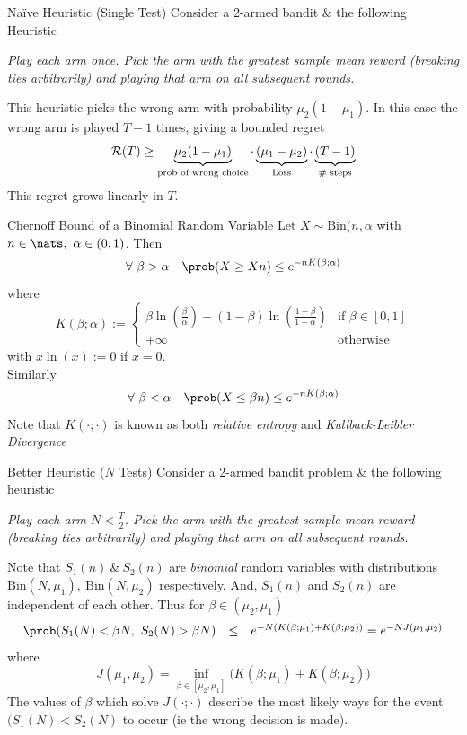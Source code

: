 \documentclass[11pt,a4paper]{article}
\begin{document}
\begin{proposition}{Na\"ive Heuristic (Single Test)}
  Consider a 2-armed bandit \& the following Heuristic
  \begin{center}
    \textit{Play each arm once. Pick the arm with the greatest sample mean reward (breaking ties arbitrarily) and playing that arm on all subsequent rounds.}
  \end{center}
  This heuristic picks the wrong arm with probability $\mu_2(1-\mu_1)$. In this case the wrong arm is played $T-1$ times, giving a bounded regret
  \[ \mathcal{R}(T)\geq\underbrace{\mu_2(1-\mu_1)}_{\tiny\text{prob of wrong choice}}\cdot\underbrace{(\mu_1-\mu_2)}_{\tiny\text{Loss}}\cdot\underbrace{(T-1)}_{\tiny\text{\# steps}} \]
  This regret grows linearly in $T$.
\end{proposition}

\begin{theorem}{Chernoff Bound of a Binomial Random Variable}
  Let $X\sim\text{Bin}(n,\alpha$ with $n\in\nats,\ \alpha\in(0,1)$. Then
  \[ \forall\ \beta>\alpha\quad\prob(X\geq Xn)\leq e^{-nK(\beta;\alpha)} \]
  where
  \[ K(\beta;\alpha):=\begin{cases}\beta\ln\left(\frac\beta\alpha\right)+(1-\beta)\ln\left(\frac{1-\beta}{1-\alpha}\right)&\text{if }\beta\in[0,1]\\+\infty&\text{otherwise}\end{cases} \]
  with $x\ln(x):=0$ if $x=0$.\\
  Similarly
  \[ \forall\ \beta<\alpha\quad\prob(X\leq\beta n)\leq e^{-nK(\beta;\alpha)} \]
  Note that $K(\cdot;\cdot)$ is known as both \textit{relative entropy} and \textit{Kullback-Leibler Divergence}
\end{theorem}

\begin{proposition}{Better Heuristic ($N$ Tests)}
  Consider a 2-armed bandit problem \& the following heuristic
  \begin{center}
    \textit{Play each arm $N<\frac{T}2$. Pick the arm with the greatest sample mean reward (breaking ties arbitrarily) and playing that arm on all subsequent rounds.}
  \end{center}
  Note that $S_1(n)\ \&\ S_2(n)$ are \textit{binomial} random variables with distributions $\text{Bin}(N,\mu_1),\ \text{Bin}(N,\mu_2)$ respectively. And, $S_1(n)$ and $S_2(n)$ are independent of each other. Thus for $\beta\in(\mu_2,\mu_1)$
  \[\begin{array}{rcl}
    \prob(S_1(N)<\beta N,\ S_2(N)>\beta N)&\leq&e^{-N(K(\beta;\mu_1)+K(\beta;\mu_2))}=e^{-NJ(\mu_1,\mu_2)}
  \end{array}\]
  where
  \[ J(\mu_1,\mu_2)=\inf_{\beta\in[\mu_2,\mu_1]}\big(K(\beta;\mu_1)+K(\beta;\mu_2)\big) \]
  The values of $\beta$ which solve $J(\cdot;\cdot)$ describe the most likely ways for the event $(S_1(N)<S_2(N)$ to occur (ie the wrong decision is made).
\end{proposition}
\end{document}
